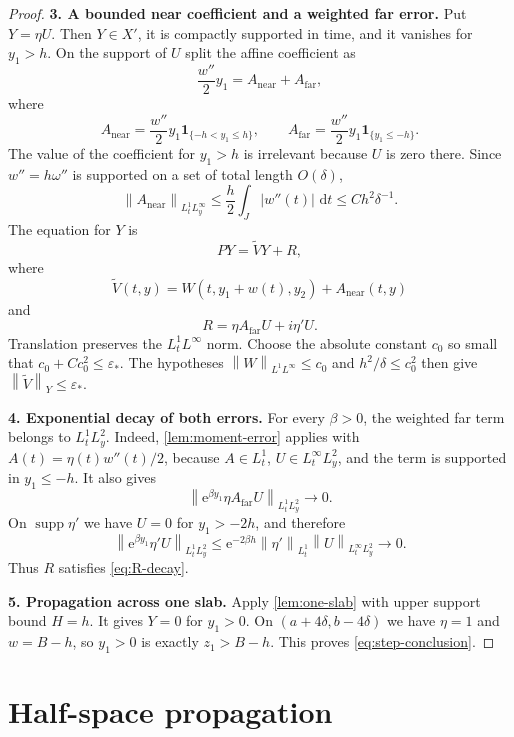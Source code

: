 \documentclass[11pt,oneside]{book}
\theoremstyle{definition}
\theoremstyle{remark}
\newcommand{\supp}{\operatorname{supp}}
\newcommand{\1}{\mathbf 1}
\newcommand{\dd}{\,\mathrm d}
\newcommand{\norm}[1]{\left\lVert #1\right\rVert}
\newcommand{\e}{\mathrm e}
\newcommand{\eps}{\varepsilon}
\begin{document}
\begin{proof}
\textbf{3. A bounded near coefficient and a weighted far error.}
Put $Y=\eta U$.  Then $Y\in X'$, it is compactly supported in time, and it
vanishes for $y_1>h$.  On the support of $U$ split the affine coefficient as
\[
 \frac{w''}2y_1=A_{\mathrm{near}}+A_{\mathrm{far}},
\]
where
\[
 A_{\mathrm{near}}
 =\frac{w''}2y_1\1_{\{-h<y_1\le h\}},
 \qquad
 A_{\mathrm{far}}
 =\frac{w''}2y_1\1_{\{y_1\le-h\}}.
\]
The value of the coefficient for $y_1>h$ is irrelevant because $U$ is zero
there.  Since $w''=h\omega''$ is supported on a set of total length
$O(\delta)$,
\begin{equation}
 \norm{A_{\mathrm{near}}}_{L^1_tL^\infty_y}
 \le \frac h2\int_J|w''(t)|\,\dd t
 \le C h^2\delta^{-1}.                            \label{eq:near-affine-small}
\end{equation}
The equation for $Y$ is
\begin{equation}
 PY=\widetilde VY+R,                                \label{eq:Y-moving-eq}
\end{equation}
where
\[
 \widetilde V(t,y)=W(t,y_1+w(t),y_2)+A_{\mathrm{near}}(t,y)
\]
and
\[
 R=\eta A_{\mathrm{far}}U+i\eta' U.
\]
Translation preserves the $L^1_tL^\infty$ norm.  Choose the absolute
constant $c_0$ so small that
$c_0+Cc_0^2\le\eps_*$.  The hypotheses
$\norm W_{L^1L^\infty}\le c_0$ and $h^2/\delta\le c_0^2$ then give
$\norm{\widetilde V}_Y\le\eps_*$.

\textbf{4. Exponential decay of both errors.}
For every $\beta>0$, the weighted far term belongs to $L^1_tL^2_y$.
Indeed, \cref{lem:moment-error} applies with
$A(t)=\eta(t)w''(t)/2$, because $A\in L^1_t$, $U\in L^\infty_tL^2_y$, and
the term is supported in $y_1\le-h$.  It also gives
\[
 \norm{\e^{\beta y_1}\eta A_{\mathrm{far}}U}_{L^1_tL^2_y}
 \longrightarrow0.
\]
On $\supp\eta'$ we have $U=0$ for $y_1>-2h$, and therefore
\[
 \norm{\e^{\beta y_1}\eta'U}_{L^1_tL^2_y}
 \le \e^{-2\beta h}\norm{\eta'}_{L^1_t}
      \norm U_{L^\infty_tL^2_y}
 \longrightarrow0.
\]
Thus $R$ satisfies \eqref{eq:R-decay}.

\textbf{5. Propagation across one slab.}
Apply \cref{lem:one-slab} with upper support bound $H=h$.  It gives
$Y=0$ for $y_1>0$.  On
$(a+4\delta,b-4\delta)$ we have $\eta=1$ and $w=B-h$, so $y_1>0$ is exactly
$z_1>B-h$.  This proves \eqref{eq:step-conclusion}.
\end{proof}

\section{Half-space propagation}
\end{document}
